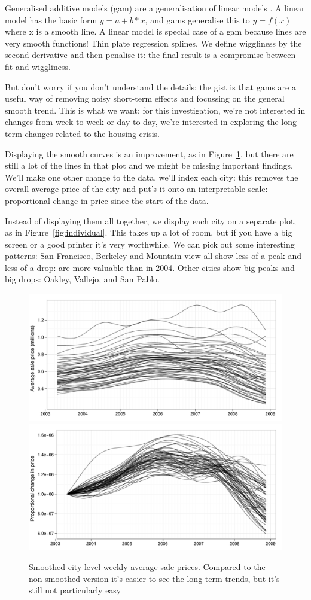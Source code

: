\documentclass[oneside]{article}
\begin{document}
Generalised additive models ({\sc gam}) are a generalisation of linear models \citep{wood:2006}.  A linear model has the basic form $y = a + b * x$, and {\sc gam}s generalise this to $y = f(x)$ where x is a smooth line.  A linear model is special case of a {\sc gam} because lines are very smooth functions!  Thin plate regression splines.  We define wiggliness by the second derivative and then penalise it: the final result is a compromise between fit and wiggliness.

But don't worry if you don't understand the details: the gist is that {\sc gam}s are a useful way of removing noisy short-term effects and focussing on the general smooth trend.  This is what we want: for this investigation, we're not interested in changes from week to week or day to day, we're interested in exploring the long term changes related to the housing crisis.

Displaying the smooth curves is an improvement, as in Figure~\ref{fig:smoothed}, but there are still a lot of the lines in that plot and we might be missing important findings.  We'll make one other change to the data, we'll index each city: this removes the overall average price of the city and put's it onto an interpretable scale: proportional change in price since the start of the data.  

Instead of displaying them all together, we display each city on a separate plot, as in Figure~\ref{fig:individual}.  This takes up a lot of room, but if you have a big screen or a good printer it's very worthwhile.  We can pick out some interesting patterns: San Francisco, Berkeley and Mountain view all show less of a peak and less of a drop: are more valuable than in 2004.  Other cities show big peaks and big drops: Oakley, Vallejo, and San Pablo.

\begin{figure}[htbp]
  \centering
  \includegraphics[width=0.5 \linewidth]{cities-smooth}%
  \includegraphics[width=0.5 \linewidth]{cities-indexed}
  \caption{Smoothed city-level weekly average sale prices.  Compared to the non-smoothed version it's easier to see the long-term trends, but it's still not particularly easy}
  \label{fig:smoothed}
\end{figure}
\end{document}
